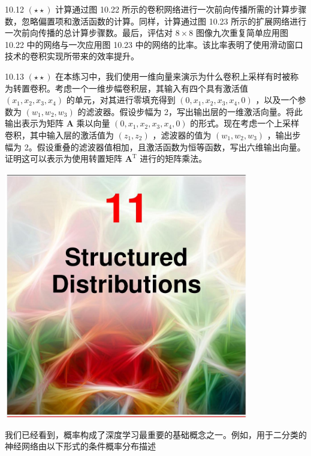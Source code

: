 \documentclass[10pt]{article}
\begin{document}
10.12 \(\left( {\star  \star  }\right)\) 计算通过图 10.22 所示的卷积网络进行一次前向传播所需的计算步骤数，忽略偏置项和激活函数的计算。同样，计算通过图 10.23 所示的扩展网络进行一次前向传播的总计算步骤数。最后，评估对 \(8 \times  8\) 图像九次重复简单应用图 10.22 中的网络与一次应用图 10.23 中的网络的比率。该比率表明了使用滑动窗口技术的卷积实现所带来的效率提升。

10.13 \(\left( {\star  \star  }\right)\) 在本练习中，我们使用一维向量来演示为什么卷积上采样有时被称为转置卷积。考虑一个一维步幅卷积层，其输入有四个具有激活值 \(\left( {{x}_{1},{x}_{2},{x}_{3},{x}_{4}}\right)\) 的单元，对其进行零填充得到 \(\left( {0,{x}_{1},{x}_{2},{x}_{3},{x}_{4},0}\right)\) ，以及一个参数为 \(\left( {{w}_{1},{w}_{2},{w}_{3}}\right)\) 的滤波器。假设步幅为 2，写出输出层的一维激活向量。将此输出表示为矩阵 \(\mathbf{A}\) 乘以向量 \(\left( {0,{x}_{1},{x}_{2},{x}_{3},{x}_{4},0}\right)\) 的形式。现在考虑一个上采样卷积，其中输入层的激活值为 \(\left( {{z}_{1},{z}_{2}}\right)\) ，滤波器的值为 \(\left( {{w}_{1},{w}_{2},{w}_{3}}\right)\) ，输出步幅为 2。假设重叠的滤波器值相加，且激活函数为恒等函数，写出六维输出向量。证明这可以表示为使用转置矩阵 \({\mathbf{A}}^{\mathrm{T}}\) 进行的矩阵乘法。

\begin{center}
\includegraphics[max width=0.8\textwidth]{images/0194e279-9b28-703a-88f4-c3ac21e2010d_344_472_349_1076_1089_0.jpg}
\end{center}
\hspace*{3em} 

我们已经看到，概率构成了深度学习最重要的基础概念之一。例如，用于二分类的神经网络由以下形式的条件概率分布描述
\end{document}

